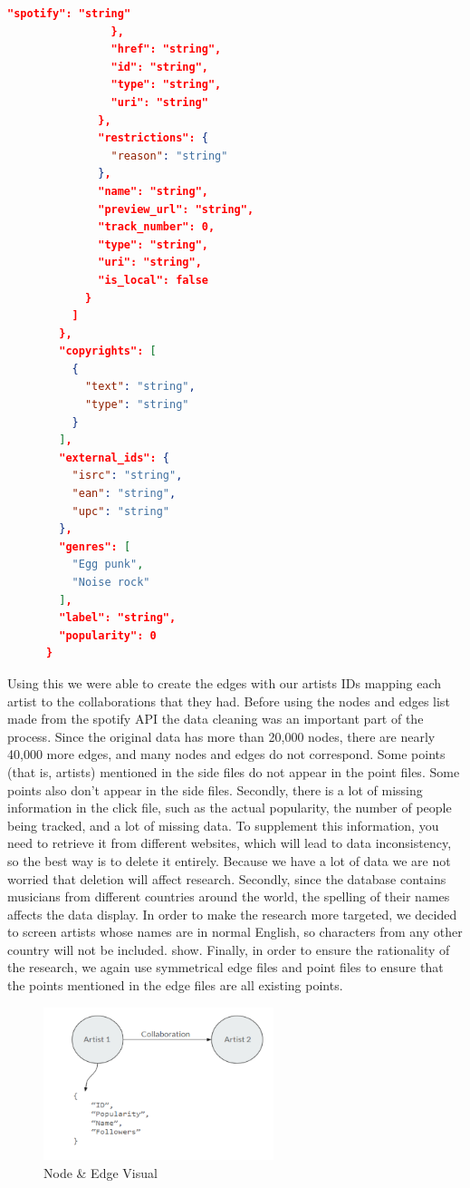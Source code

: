 \documentclass[12pt,a4paper]{article}
\begin{document}
\begin{lstlisting}[language=json,firstnumber=1]
                  "spotify": "string"
                },
                "href": "string",
                "id": "string",
                "type": "string",
                "uri": "string"
              },
              "restrictions": {
                "reason": "string"
              },
              "name": "string",
              "preview_url": "string",
              "track_number": 0,
              "type": "string",
              "uri": "string",
              "is_local": false
            }
          ]
        },
        "copyrights": [
          {
            "text": "string",
            "type": "string"
          }
        ],
        "external_ids": {
          "isrc": "string",
          "ean": "string",
          "upc": "string"
        },
        "genres": [
          "Egg punk",
          "Noise rock"
        ],
        "label": "string",
        "popularity": 0
      }
      \end{lstlisting}
      Using this we were able to create the edges with our artists IDs mapping each artist to the collaborations that they had.  Before using the nodes and edges list made from the spotify API the data cleaning was an important part of the process. Since the original data has more than 20,000 nodes, there are nearly 40,000 more edges, and many nodes and edges do not correspond. Some points (that is, artists) mentioned in the side files do not appear in the point files. Some points also don't appear in the side files. Secondly, there is a lot of missing information in the click file, such as the actual popularity, the number of people being tracked, and a lot of missing data. To supplement this information, you need to retrieve it from different websites, which will lead to data inconsistency, so the best way is to delete it entirely. Because we have a lot of data we are not worried that deletion will affect research. Secondly, since the database contains musicians from different countries around the world, the spelling of their names affects the data display. In order to make the research more targeted, we decided to screen artists whose names are in normal English, so characters from any other country will not be included. show. Finally, in order to ensure the rationality of the research, we again use symmetrical edge files and point files to ensure that the points mentioned in the edge files are all existing points.
      \begin{figure}[h]
        \centering
        \includegraphics[width=0.6\textwidth]{node}
        \caption{Node \& Edge Visual}
        \label{fig:mesh1}
    \end{figure}\\
\end{document}
